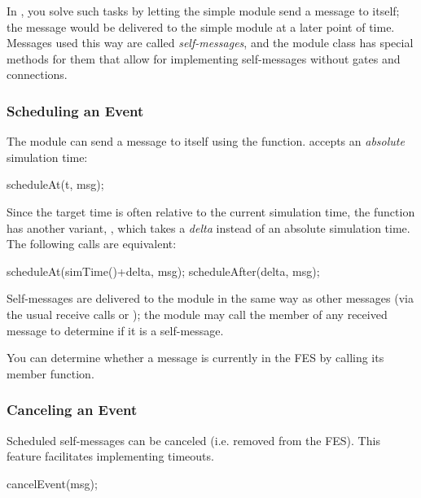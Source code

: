 \begin{ned}
In {\opp}, you solve such tasks by letting the simple module send a message
to itself; the message would be delivered to the simple module at a later
point of time. Messages used this way are called
\textit{self-messages}, and the module class has
special methods for them that allow for implementing self-messages without
gates and connections.

\subsubsection{Scheduling an Event}
\label{sec:simple-modules:scheduling}

The module can send a message to itself using the  function.
 accepts an \textit{absolute} simulation time:

\begin{cpp}
scheduleAt(t, msg);
\end{cpp}

Since the target time is often relative to the current simulation time,
the function has another variant, , which takes
a \textit{delta} instead of an absolute simulation time. The following
calls are equivalent:

\begin{cpp}
scheduleAt(simTime()+delta, msg);
scheduleAfter(delta, msg);
\end{cpp}

Self-messages are delivered to the module in the same way as other
messages (via the usual receive calls or );
the module may call the  member of any received
message to determine if it is a self-message.

You can determine whether a message is currently in the FES
by calling its  member function.

\subsubsection{Canceling an Event}
\label{sec:simple-modules:canceling}

Scheduled self-messages can be canceled
 (i.e. removed from the FES).
This feature facilitates implementing timeouts.

\begin{cpp}
cancelEvent(msg);
\end{cpp}


\end{ned}
